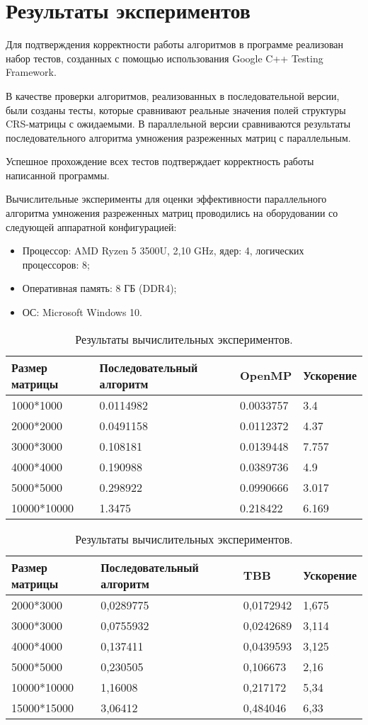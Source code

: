 \documentclass{report}
\begin{document}
\section* {Результаты экспериментов}
Для подтверждения корректности работы алгоритмов в программе реализован набор тестов, созданных с помощью использования Google C++ Testing Framework.
\par В качестве проверки алгоритмов, реализованных в последовательной версии, были созданы тесты, которые сравнивают реальные значения полей структуры CRS-матрицы с ожидаемыми. В параллельной версии сравниваются результаты последовательного алгоритма умножения разреженных матриц с параллельным.
\par Успешное прохождение всех тестов подтверждает корректность работы написанной программы.
\par Вычислительные эксперименты для оценки эффективности параллельного алгоритма умножения разреженных матриц проводились на оборудовании со следующей аппаратной конфигурацией:
\begin{itemize}
\item Процессор: AMD Ryzen 5 3500U, 2,10 GHz, ядер: 4, логических процессоров: 8;
\item Оперативная память: 8 ГБ (DDR4);
\item ОС: Microsoft Windows 10.
\end{itemize}
\begin{table}[!h]
\caption{Результаты вычислительных экспериментов.}
\begin{tabular}{ | l | l | l | l |}
\hline
Размер матрицы & Последовательный алгоритм & OpenMP & Ускорение \\ \hline
1000*1000 & 0.0114982 & 0.0033757 & 3.4 \\
2000*2000 & 0.0491158 & 0.0112372 & 4.37 \\
3000*3000 & 0.108181 & 0.0139448 & 7.757 \\
4000*4000 & 0.190988 & 0.0389736 & 4.9 \\
5000*5000 & 0.298922 & 0.0990666 & 3.017 \\
10000*10000 & 1.3475 & 0.218422 &  6.169 \\ \hline
\end{tabular}
\end{table}
\newpage
\begin{table}[!h]
\caption{Результаты вычислительных экспериментов.}
\begin{tabular}{ | l | l | l | l |}
\hline
Размер матрицы & Последовательный алгоритм & TBB & Ускорение \\ \hline
2000*3000 & 0,0289775 & 0,0172942 & 1,675 \\
3000*3000 & 0,0755932 & 0,0242689 &  3,114\\
4000*4000 & 0,137411 & 0,0439593 & 3,125\\ 
5000*5000 & 0,230505 & 0,106673 & 2,16\\ 
10000*10000 & 1,16008 & 0,217172 & 5,34\\ 
15000*15000 & 3,06412 & 0,484046 &  6,33 \\ \hline
 \end{tabular}
\end{table}
\end{document}
